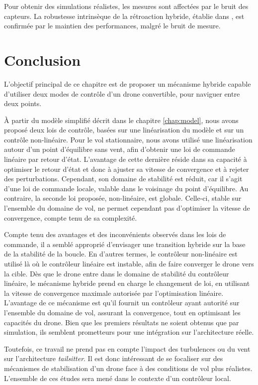 Pour obtenir des simulations réalistes, les mesures sont affectées par 
le bruit des capteurs. La robustesse intrinsèque de la rétroaction hybride, établie dans \cite[Chapitre 7]{65}, est confirmée par le maintien des performances, malgré le bruit de mesure.

\section{Conclusion}

L'objectif principal de ce chapitre est de proposer un mécanisme hybride capable d'utiliser deux modes de contrôle d'un drone convertible, pour naviguer entre deux points. 

À partir du modèle simplifié décrit dans le chapitre \ref{chap:model}, nous avons proposé deux lois de contrôle, basées sur une linéarisation du modèle et sur un contrôle non-linéaire.
Pour le vol stationnaire, nous avons utilisé une linéarisation autour d'un point d'équilibre sans vent, afin d'obtenir une loi de commande linéaire par retour d'état. L'avantage de cette dernière réside dans sa capacité à optimiser le retour d'état et donc à ajuster sa vitesse de convergence et à rejeter des perturbations.  Cependant, son domaine de stabilité est réduit, car il s'agit d'une loi de commande locale, valable dans le voisinage du point d'équilibre. Au contraire, la seconde loi proposée, non-linéaire, est globale. Celle-ci, stable sur l'ensemble du domaine de vol, ne permet cependant pas d'optimiser la vitesse de convergence, compte tenu de sa complexité.

Compte tenu des avantages et des inconvénients observés dans les lois de commande, il a semblé approprié d'envisager une transition hybride sur la base de la stabilité de la boucle. En d'autres termes, le contrôleur non-linéaire est utilisé là où le contrôleur linéaire est instable, afin de faire converger le drone vers la cible. Dès que le drone entre dans le domaine de stabilité du contrôleur linéaire, le mécanisme hybride prend en charge le changement de loi, en utilisant la vitesse de convergence maximale autorisée par l'optimisation linéaire. L'avantage de ce mécanisme est qu'il fournit un contrôleur ayant autorité sur l'ensemble du domaine de vol, assurant la convergence, tout en optimisant les capacités du drone. Bien que les premiers résultats ne soient obtenus que par simulation, ils semblent prometteurs pour une intégration sur l'architecture réelle.

Toutefois, ce travail ne prend pas en compte l'impact des turbulences ou du vent sur l'architecture \textit{tailsitter}. Il est donc intéressant de se focaliser sur des mécanismes de stabilisation d'un drone face à des conditions de vol plus réalistes. L'ensemble de ces études sera mené dans le contexte d'un contrôleur local.

